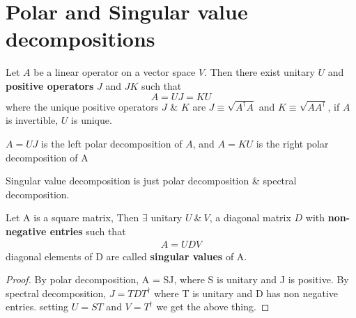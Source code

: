 \section{Polar and Singular value decompositions}
\begin{theorem}
    Let $A$ be a linear operator on a vector space $V$. Then there exist unitary $U$ and \textbf{positive operators} $J$ and $JK$ such that
    \begin{equation}
        A = UJ = KU
    \end{equation}
    where the unique positive operators $J$ \& $K$ are $J \equiv \sqrt{A^\dag A}$ and $K \equiv \sqrt{AA^\dag}$, if $A$ is invertible, $U$ is unique.
\end{theorem}
$A=UJ$ is the left polar decomposition of $A$, and $A=KU$ is the right polar decomposition of A

Singular value decomposition is just polar decomposition \& spectral decomposition.
\begin{corollary}
    Let A is a square matrix, Then $\exists$ unitary $U\ \& \ V$, a diagonal matrix $D$ with \textbf{non-negative entries} such that
    \begin{align}
        A = UDV
    \end{align}
    diagonal elements of D are called \textbf{singular values} of A.
\end{corollary}
\begin{proof}
    By polar decomposition, A = SJ, where S is unitary and J is positive.  By spectral decomposition, $J = TDT^\dag$ where T is unitary and D has non negative entries. setting $U=ST$ and $V=T^\dag$ we get the above thing.
\end{proof}